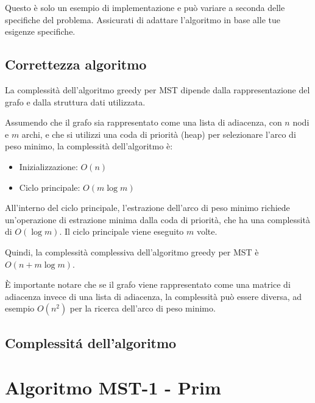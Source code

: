 Questo è solo un esempio di implementazione e può variare a seconda delle specifiche del problema. Assicurati di adattare l'algoritmo in base alle tue esigenze specifiche.

\subsection{Correttezza algoritmo}


La complessità dell'algoritmo greedy per MST dipende dalla rappresentazione del grafo e dalla struttura dati utilizzata.

Assumendo che il grafo sia rappresentato come una lista di adiacenza, con $n$ nodi e $m$ archi, e che si utilizzi una coda di priorità (heap) per selezionare l'arco di peso minimo, la complessità dell'algoritmo è:

\begin{itemize}
    \item Inizializzazione: $O(n)$
    \item Ciclo principale: $O(m \log m)$
\end{itemize}

All'interno del ciclo principale, l'estrazione dell'arco di peso minimo richiede un'operazione di estrazione minima dalla coda di priorità, che ha una complessità di $O(\log m)$. Il ciclo principale viene eseguito $m$ volte.

Quindi, la complessità complessiva dell'algoritmo greedy per MST è $O(n + m \log m)$.

È importante notare che se il grafo viene rappresentato come una matrice di adiacenza invece di una lista di adiacenza, la complessità può essere diversa, ad esempio $O(n^2)$ per la ricerca dell'arco di peso minimo.
\subsection{Complessit\'a dell'algoritmo}






\section{Algoritmo MST-1 - Prim}

\begin{center}
\end{center}


